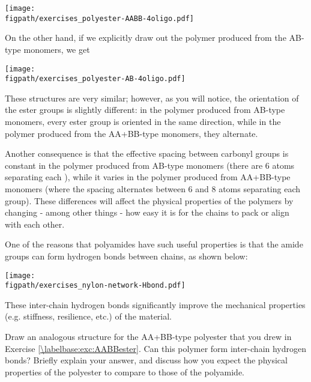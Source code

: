 \begin{activity}
\begin{exercises}
\begin{enumerate}
\begin{solution}
{						\centerline{\texttt{[image: \\figpath/exercises\_polyester-AABB-4oligo.pdf]}}
						
						On the other hand, if we explicitly draw out the polymer produced from the AB-type monomers, we get
						
						\centerline{\texttt{[image: \\figpath/exercises\_polyester-AB-4oligo.pdf]}}
						
						These structures are very similar; however, as you will notice, the orientation of the ester groups is slightly different: in the polymer produced from AB-type monomers, every ester group is oriented in the same direction, while in the polymer produced from the AA+BB-type monomers, they alternate.
						
						Another consequence is that the effective spacing between carbonyl groups is constant in the polymer produced from AB-type monomers (there are 6 atoms separating each ), while it varies in the polymer produced from AA+BB-type monomers (where the spacing alternates between 6 and 8 atoms separating each  group).
						These differences will affect the physical properties of the polymers by changing - among other things - how easy it is for the chains to pack or align with each other.
						
					}\end{solution}
					
			\end{enumerate}
		
		\exercise One of the reasons that polyamides have such useful properties is that the amide groups can form hydrogen bonds between chains, as shown below:
			
			\centerline{\texttt{[image: \\figpath/exercises\_nylon-network-Hbond.pdf]}}	
		
			These inter-chain hydrogen bonds significantly improve the mechanical properties (e.g. stiffness, resilience, etc.) of the material.
			
			Draw an analogous structure for the AA+BB-type polyester that you drew in Exercise \ref{\labelbase:exc:AABBester}.  Can this polymer form inter-chain hydrogen bonds?  Briefly explain your answer, and discuss how you expect the physical properties of the polyester to compare to those of the polyamide.
			
			\begin{solution}
\end{solution}
\end{exercises}
\end{activity}
